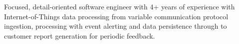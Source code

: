 

\begin{cvparagraph}
    Focused, detail-oriented software engineer with 4+ years of experience with Internet-of-Things data processing from variable communication protocol ingestion, processing with event alerting and data persistence through to customer report generation for periodic feedback.
\end{cvparagraph}